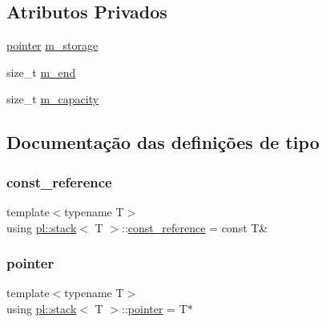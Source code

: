 \subsection*{Atributos Privados}
\begin{DoxyCompactItemize}
\item 
\hyperlink{classpl_1_1stack_a3713c8d6cb6cc72c07a445b11c39ae43}{pointer} \hyperlink{classpl_1_1stack_a65f803f7a3ddb160cf77ed0d53d514cd}{m\+\_\+storage}
\item 
size\+\_\+t \hyperlink{classpl_1_1stack_ad9bcc4e4ca264cbf14b6f475a7051d82}{m\+\_\+end}
\item 
size\+\_\+t \hyperlink{classpl_1_1stack_abfd4b98e0b4fc570fdceb1ebafa4738e}{m\+\_\+capacity}
\end{DoxyCompactItemize}


\subsection{Documentação das definições de tipo}
\mbox{\label{classpl_1_1stack_a9474b23cf6fa5332f22fc06852e2d6d5}} 
\subsubsection{\texorpdfstring{const\+\_\+reference}{const\_reference}}
{\footnotesize\ttfamily template$<$typename T$>$ \\
using \hyperlink{classpl_1_1stack}{pl\+::stack}$<$ T $>$\+::\hyperlink{classpl_1_1stack_a9474b23cf6fa5332f22fc06852e2d6d5}{const\+\_\+reference} =  const T\&\hspace{0.3cm}{\ttfamily [private]}}

\mbox{\label{classpl_1_1stack_a3713c8d6cb6cc72c07a445b11c39ae43}} 
\subsubsection{\texorpdfstring{pointer}{pointer}}
{\footnotesize\ttfamily template$<$typename T$>$ \\
using \hyperlink{classpl_1_1stack}{pl\+::stack}$<$ T $>$\+::\hyperlink{classpl_1_1stack_a3713c8d6cb6cc72c07a445b11c39ae43}{pointer} =  T$\ast$\hspace{0.3cm}{\ttfamily [private]}}

